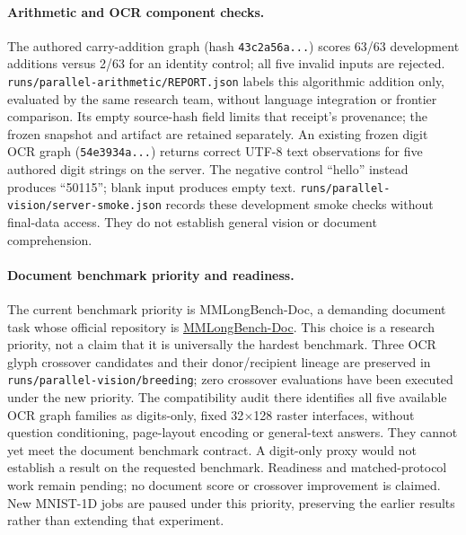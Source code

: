 \documentclass[11pt]{article}
\begin{document}
\paragraph{Arithmetic and OCR component checks.}
The authored carry-addition graph (hash \texttt{43c2a56a...}) scores 63/63
development additions versus 2/63 for an identity control; all five invalid
inputs are rejected. \texttt{runs/parallel-arithmetic/REPORT.json} labels this
algorithmic addition only, evaluated by the same research team, without language
integration or frontier comparison. Its empty source-hash field limits that
receipt's provenance; the frozen snapshot and artifact are retained separately.
An existing frozen digit OCR graph (\texttt{54e3934a...}) returns correct UTF-8
text observations for five authored digit strings on the server. The negative
control ``hello'' instead produces ``50115''; blank input produces empty text.
\texttt{runs/parallel-vision/server-smoke.json} records these development smoke
checks without final-data access. They do not establish general vision or
document comprehension.

\paragraph{Document benchmark priority and readiness.}
The current benchmark priority is MMLongBench-Doc, a demanding document task
whose official repository is
\href{https://github.com/mayubo2333/MMLongBench-Doc}{MMLongBench-Doc}.
This choice is a research priority, not a claim that it is universally the
hardest benchmark. Three OCR glyph crossover candidates and their donor/recipient
lineage are preserved in \texttt{runs/parallel-vision/breeding}; zero crossover
evaluations have been executed under the new priority. The compatibility audit
there identifies all five available OCR graph families as digits-only, fixed
32$\times$128 raster interfaces, without question conditioning, page-layout
encoding or general-text answers. They cannot yet meet the document benchmark
contract. A digit-only proxy would not establish a result on the requested
benchmark. Readiness and matched-protocol work remain pending; no document score
or crossover improvement is claimed. New MNIST-1D jobs are paused under this
priority, preserving the earlier results rather than extending that experiment.
\end{document}
